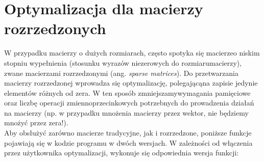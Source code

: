 \documentclass[a4paper,margin=1.54cm]{article}
\begin{document}
\section{Optymalizacja dla macierzy rozrzedzonych}

W przypadku macierzy o dużych rozmiarach, często spotyka się macierze\linebreak o niskim stopniu wypełnienia (stosunku wyrazów niezerowych do rozmiaru\linebreak macierzy), zwane macierzami rozrzedzonymi (ang. \textit{sparse matrices}). Do przetwarzania macierzy rozrzedzonej wprowadza się optymalizację, polegającą\linebreak na zapisie jedynie elementów różnych od zera. W ten sposób zmniejszamy\linebreak wymagania pamięciowe oraz liczbę operacji zmiennoprzecinkowych potrzebnych do prowadzenia działań na macierzy (np. w przypadku mnożenia macierzy przez wektor, nie będziemy mnożyć przez zera!)\cite{mimuwprzykre}.\\
Aby obsłużyć zarówno macierze tradycyjne, jak i rozrzedzone, poniższe funkcje pojawiają się w kodzie programu w dwóch wersjach. W zależności od włączenia przez użytkownika optymalizacji, wykonuje się odpowiednia wersja funkcji: 
\end{document}
